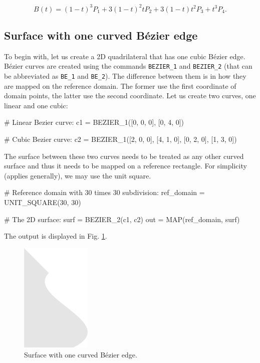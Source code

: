 $$
  B(t) = (1 - t)^3 P_1 + 3(1 - t)^2t P_2 + 3(1-t)t^2 P_3 + t^3 P_4.
$$ 

\subsection{Surface with one curved B\'ezier edge}

To begin with, let us create a 2D quadrilateral that has one cubic B\'ezier edge. 
B\'ezier curves are created using the commands {\tt BEZIER\_1} and {\tt BEZIER\_2} 
(that can be abbreviated as {\tt BE\_1} and {\tt BE\_2}). The difference between
them is in how they are mapped on the reference domain. The former use the 
first coordinate of domain points, the latter use the second coordinate. Let
us create two curves, one linear and one cubic:

\begin{bluecode}
# Linear Bezier curve:
c1 = BEZIER_1([0, 0, 0], [0, 4, 0])

# Cubic Bezier curve:
c2 = BEZIER_1([2, 0, 0], [4, 1, 0], [0, 2, 0], [1, 3, 0])
\end{bluecode}
\noindent
The surface between these two curves needs to be treated as any other curved 
surface and thus it needs to be mapped on a reference rectangle. For simplicity 
(applies generally), we may use the unit square. 

\begin{bluecode}
# Reference domain with 30 times 30 subdivision:
ref_domain = UNIT_SQUARE(30, 30)

# The 2D surface:
surf = BEZIER_2(c1, c2)
out = MAP(ref_domain, surf)
\end{bluecode}
The output is displayed in Fig. \ref{fig:curves-1}.\\

\begin{figure}[!ht]
\begin{center}
\includegraphics[width=0.3\textwidth]{img/curves-1.png}
\end{center}
\vspace{-4mm}
\caption{Surface with one curved B\'ezier edge.}
\label{fig:curves-1}
\end{figure}

